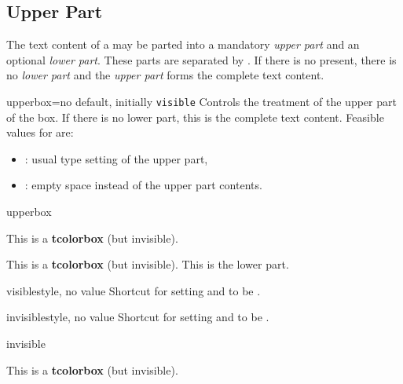 \clearpage
\subsection{Upper Part}
The text content of a  may be parted into a mandatory \emph{upper part}
and an optional \emph{lower part}. These parts are separated by
. If there is no  present, there is no
\emph{lower part} and the \emph{upper part} forms the complete text content.

\begin{docTcbKey}[][doc new=2015-01-06]{upperbox}{=}{no default, initially \texttt{visible}}
  Controls the treatment of the upper part of the box. If there is no lower part,
  this is the complete text content.
  Feasible values for  are:
  \begin{itemize}
  \item{}: usual type setting of the upper part,
  \item{}: empty space instead of the upper part contents.
  \end{itemize}
\begin{exdispExample}{upperbox}
\begin{tcolorbox}[upperbox=invisible,colback=white]
This is a \textbf{tcolorbox} (but invisible).
\end{tcolorbox}

\bigskip

\begin{tcolorbox}[upperbox=invisible,colback=white]
This is a \textbf{tcolorbox} (but invisible).
\tcblower
This is the lower part.
\end{tcolorbox}
\end{exdispExample}
\end{docTcbKey}


\begin{docTcbKey}[][doc new=2015-01-06]{visible}{}{style, no value}
  Shortcut for setting  and 
  to be .
\end{docTcbKey}

\begin{docTcbKey}[][doc new=2015-01-06]{invisible}{}{style, no value}
  Shortcut for setting  and 
  to be .
\begin{exdispExample}{invisible}
\begin{tcolorbox}[invisible]
This is a \textbf{tcolorbox} (but invisible).
\end{tcolorbox}
\end{exdispExample}
\end{docTcbKey}


